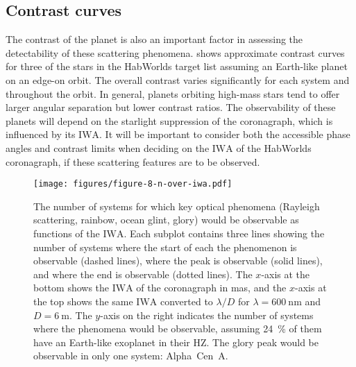 \documentclass[usenatbib]{mnras}
\newcommand{\IWA}{\ensuremath{\mathrm{IWA}}\xspace}
\newcommand{\HWO}{HabWorlds\xspace}
\begin{document}
\subsection{Contrast curves}
\label{sec:results_contrast}

The contrast of the planet is also an important factor in assessing the detectability of these scattering phenomena. 
 shows approximate contrast curves for three of the stars in the \HWO target list assuming an Earth-like planet on an edge-on orbit.
The overall contrast varies significantly for each system and throughout the orbit. In general, planets orbiting high-mass stars tend to offer larger angular separation but lower contrast ratios. 
The observability of these planets will depend on the starlight suppression of the coronagraph, which is influenced by its \IWA.
It will be important to consider both the accessible phase angles and contrast limits when deciding on the \IWA of the \HWO coronagraph, if these scattering features are to be observed.


\begin{figure*}
    \centering
    \texttt{[image: figures/figure-8-n-over-iwa.pdf]}
    \caption{
        The number of systems for which key optical phenomena (Rayleigh scattering, rainbow, ocean glint, glory) would be observable as functions of the \IWA.
        Each subplot contains three lines showing the number of systems where the start of each the phenomenon is observable (dashed lines), where the peak is observable (solid lines), and where the end is observable (dotted lines).
        The $x$-axis at the bottom shows the \IWA of the coronagraph in \unit{mas}, and the $x$-axis at the top shows the same \IWA converted to $\lambda/D$ for $\lambda = \qty{600}{\nano\meter}$ and $D = \qty{6}{\meter}$.
        The $y$-axis on the right indicates the number of systems where 
        the phenomena would be observable, assuming \qty{24}{\percent} of them have an Earth-like exoplanet in their HZ.
        The glory peak would be observable in only one system: Alpha~Cen~A.
    }
    \label{fig:accessible_phase_angles}
\end{figure*}
\end{document}
